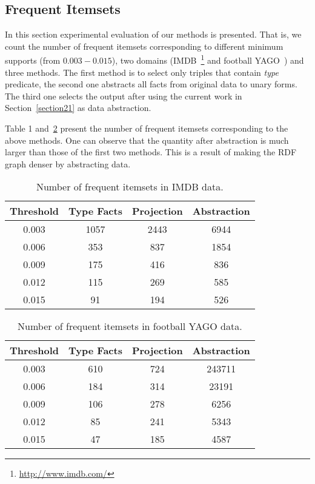 \subsection{Frequent Itemsets}

In this section experimental evaluation of our methods is presented. That is, we count the number of frequent itemsets corresponding to different minimum supports (from $0.003 - 0.015$), two domains (IMDB~\footnote{\url{http://www.imdb.com/}} and football YAGO~\cite{ref4}) and three methods. The first method is to select only triples that contain \textit{type} predicate, the second one abstracts all facts from original data to unary forms. The third one selects the output after using the current work in Section~\ref{section21} as data abstraction.

Table 1 and~\ref{table2} present the number of frequent itemsets corresponding to the above methods. One can observe that the quantity after abstraction is much larger than those of the first two methods. This is a result of making the RDF graph denser by abstracting data.

\begin{table}[ht]
\label{table1}
\caption{Number of frequent itemsets in IMDB data.}
\begin{center}
\begin{tabular}{ |c|c|c|c| } 
\hline
Threshold & Type Facts & Projection & Abstraction\\
\hline
0.003 & 1057 & 2443 & 6944 \\
0.006 & 353 & 837 & 1854 \\
0.009 & 175 & 416 & 836 \\
0.012 & 115 & 269 & 585 \\
0.015 & 91 & 194 & 526 \\
\hline
\end{tabular}
\end{center}
\end{table}

\begin{table}[ht]
\caption{Number of frequent itemsets in football YAGO data.}
\label{table2}
\begin{center}
\begin{tabular}{ |c|c|c|c| } 
\hline
Threshold & Type Facts & Projection & Abstraction\\
\hline
0.003 & 610 & 724 & 243711 \\
0.006 & 184 & 314 & 23191 \\
0.009 & 106 & 278 & 6256 \\
0.012 & 85 & 241 & 5343 \\
0.015 & 47 & 185 & 4587 \\
\hline
\end{tabular}
\end{center}
\end{table}

